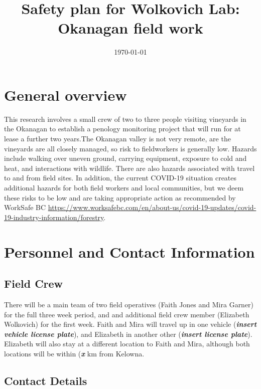 \documentclass[11pt,letter]{article}
\begin{document}

\renewcommand{\refname}{\CHead{}}

\title{Safety plan for Wolkovich Lab: Okanagan field work}
\date{\today}
\maketitle
\tableofcontents

\section{General overview}
This research involves a small crew of two to three people visiting vineyards in the Okanagan to establish a penology monitoring project that will run for at lease a further two years.The Okanagan valley is not very remote, are the vineyards are all closely managed, so risk to fieldworkers is generally low. Hazards include walking over uneven ground, carrying equipment, exposure to cold and heat, and interactions with wildlife. There are also hazards associated with travel to and from field sites. In addition, the current COVID-19 situation creates additional hazards for both field workers and local communities, but we deem these risks to be low and are taking appropriate action as recommended by WorkSafe BC \url{https://www.worksafebc.com/en/about-us/covid-19-updates/covid-19-industry-information/forestry}. 

\section{Personnel and Contact Information}

\subsection {Field Crew}

There will be a main team of two field operatives (Faith Jones and Mira Garner) for the full three week period, and and additional field crew member (Elizabeth Wolkovich) for the first week. Faith and Mira will travel up in one vehicle (\textbf{\textit{insert vehicle license plate}}), and Elizabeth in another other (\textbf{\textit{insert license plate}}). Elizabeth will also stay at a different location to Faith and Mira, although both locations will be within (\textbf{\textit{x}} km from Kelowna.   

\subsection {Contact Details}
\end{document}
